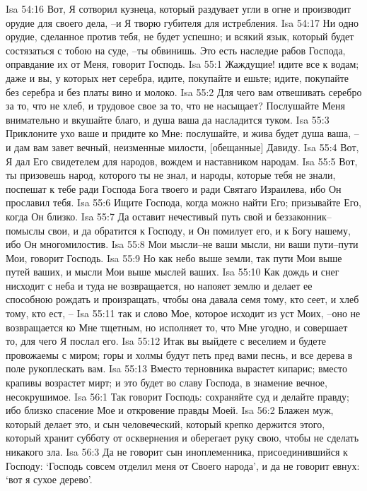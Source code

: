Isa 54:16  Вот, Я сотворил кузнеца, который раздувает угли в огне и производит орудие для своего дела, --и Я творю губителя для истребления.
Isa 54:17  Ни одно орудие, сделанное против тебя, не будет успешно; и всякий язык, который будет состязаться с тобою на суде, --ты обвинишь. Это есть наследие рабов Господа, оправдание их от Меня, говорит Господь.
Isa 55:1  Жаждущие! идите все к водам; даже и вы, у которых нет серебра, идите, покупайте и ешьте; идите, покупайте без серебра и без платы вино и молоко.
Isa 55:2  Для чего вам отвешивать серебро за то, что не хлеб, и трудовое свое за то, что не насыщает? Послушайте Меня внимательно и вкушайте благо, и душа ваша да насладится туком.
Isa 55:3  Приклоните ухо ваше и придите ко Мне: послушайте, и жива будет душа ваша, --и дам вам завет вечный, неизменные милости, [обещанные] Давиду.
Isa 55:4  Вот, Я дал Его свидетелем для народов, вождем и наставником народам.
Isa 55:5  Вот, ты призовешь народ, которого ты не знал, и народы, которые тебя не знали, поспешат к тебе ради Господа Бога твоего и ради Святаго Израилева, ибо Он прославил тебя.
Isa 55:6  Ищите Господа, когда можно найти Его; призывайте Его, когда Он близко.
Isa 55:7  Да оставит нечестивый путь свой и беззаконник--помыслы свои, и да обратится к Господу, и Он помилует его, и к Богу нашему, ибо Он многомилостив.
Isa 55:8  Мои мысли--не ваши мысли, ни ваши пути--пути Мои, говорит Господь.
Isa 55:9  Но как небо выше земли, так пути Мои выше путей ваших, и мысли Мои выше мыслей ваших.
Isa 55:10  Как дождь и снег нисходит с неба и туда не возвращается, но напояет землю и делает ее способною рождать и произращать, чтобы она давала семя тому, кто сеет, и хлеб тому, кто ест, --
Isa 55:11  так и слово Мое, которое исходит из уст Моих, --оно не возвращается ко Мне тщетным, но исполняет то, что Мне угодно, и совершает то, для чего Я послал его.
Isa 55:12  Итак вы выйдете с веселием и будете провожаемы с миром; горы и холмы будут петь пред вами песнь, и все дерева в поле рукоплескать вам.
Isa 55:13  Вместо терновника вырастет кипарис; вместо крапивы возрастет мирт; и это будет во славу Господа, в знамение вечное, несокрушимое.
Isa 56:1  Так говорит Господь: сохраняйте суд и делайте правду; ибо близко спасение Мое и откровение правды Моей.
Isa 56:2  Блажен муж, который делает это, и сын человеческий, который крепко держится этого, который хранит субботу от осквернения и оберегает руку свою, чтобы не сделать никакого зла.
Isa 56:3  Да не говорит сын иноплеменника, присоединившийся к Господу: `Господь совсем отделил меня от Своего народа', и да не говорит евнух: `вот я сухое дерево'.
